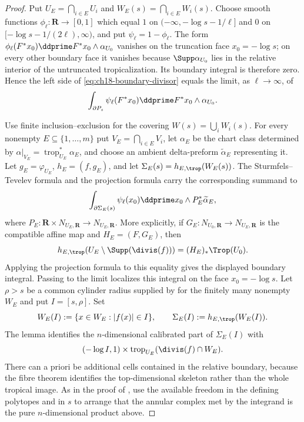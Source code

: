 \begin{proof}
Put $U_E=\bigcap_{i\in E}U_i$ and
$W_E(s)=\bigcap_{i\in E}W_i(s)$.  Choose smooth functions
$\phi_\ell:\mathbf R\to[0,1]$ which equal $1$ on
$(-\infty,-\log s-1/\ell]$ and $0$ on
$[-\log s-1/(2\ell),\infty)$, and put $\psi_\ell=1-\phi_\ell$.  The form
$\phi_\ell(F^*x_0)\ddprime F^*x_0\wedge\alpha_{U_0}$ vanishes on the
truncation face $x_0=-\log s$; on every other boundary face it vanishes
because $\Supp\alpha_{U_0}$ lies in the relative interior of the
untruncated tropicalization.  Its boundary integral is therefore zero.
Hence the left side of
\eqref{eq:ch18-boundary-divisor} equals the limit, as $\ell\to\infty$, of
\[
 \int_{\partial P_s}\psi_\ell(F^*x_0)\ddprime F^*x_0
                         \wedge\alpha_{U_0}.
\]

Use finite inclusion--exclusion for the covering $W(s)=\bigcup_iW_i(s)$.
For every nonempty $E\subseteq\{1,\dots,m\}$ put
$V_E=\bigcap_{i\in E}V_i$, let $\alpha_E$ be the chart class determined by
$\alpha|_{V_E}=\operatorname{trop}_{U_E}^*\alpha_E$, and choose an ambient
delta-preform $\widetilde\alpha_E$ representing it.  Let
$g_E=\varphi_{U_E}$, $h_E=(f,g_E)$, and let
$\Sigma_E(s)=h_{E,\trop}(W_E(s))$.  The Sturmfels--Tevelev formula and the
projection formula carry the corresponding summand to
\[
 \int_{\partial\Sigma_E(s)}
       \psi_\ell(x_0)\ddprime x_0\wedge P_E^*\widetilde\alpha_E,
\]
where $P_E:\mathbf R\times N_{U_E,\mathbf R}\to N_{U_E,\mathbf R}$.
More explicitly, if $G_E:N_{U_0,\mathbf R}\to N_{U_E,\mathbf R}$ is the
compatible affine map and $H_E=(F,G_E)$, then
\[
 h_{E,\trop}(U_E\setminus\Supp(\divis(f)))
       =(H_E)_*\Trop(U_0).
\]
Applying the projection formula to this equality gives the displayed
boundary integral.  Passing to the limit localizes this integral on the
face $x_0=-\log s$.  Let $\rho>s$ be a common cylinder radius supplied by
 for the finitely many nonempty $W_E$ and put
$I=[s,\rho]$.  Set
\[
 W_E(I):=\{x\in W_E:|f(x)|\in I\},
 \qquad
 \Sigma_E(I):=h_{E,\trop}(W_E(I)).
\]
The lemma identifies the $n$-dimensional calibrated part of
$\Sigma_E(I)$ with
\[
 (-\log I,1)\times
 \operatorname{trop}_{U_E}(\divis(f)\cap W_E).
\]
There can a priori be additional cells contained in the relative boundary,
because the fibre theorem identifies the top-dimensional skeleton rather
than the whole tropical image.  As in the proof of
\cite[Lemma~7.3, equations~(7.3.8)--(7.3.9)]{GK17}, use the available
freedom in the defining polytopes and in $s$ to arrange that the annular
complex met by the integrand is the pure $n$-dimensional product above.

\end{proof}
